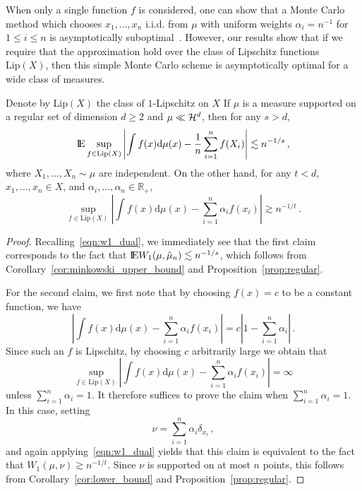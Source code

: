 \documentclass[sts]{imsart}
\newcommand{\RR}{\mathbb{R}}
\begin{document}
When only a single function $f$ is considered, one can show that a Monte Carlo method which chooses $x_1, \dots, x_n$ i.i.d. from $\mu$ with uniform weights $\alpha_i = n^{-1}$ for $1 \leq i \leq n$ is asymptotically suboptimal~\cite{Nov88}.
However, our results show that if we require that the approximation hold over the class of Lipschitz functions $\mathrm{Lip}(X)$, then this simple Monte Carlo scheme is asymptotically optimal for a wide class of measures.
\begin{proposition}
Denote by $\mathrm{Lip}(X)$ the class of $1$-Lipschitz on $X$
If $\mu$ is a measure supported on a regular set of dimension $d \geq 2$ and $\mu \ll \mathcal{H}^d$, then for any $s > d$,
\begin{equation*}
{\rm I}\kern-0.18em{\rm E}\sup_{f \in \mathrm{Lip}(X)}\left| \int f(x) \mathrm{d}\mu(x) - \frac 1 n \sum_{i=1}^n f(X_i)\right| \lesssim n^{-1/s}\,,
\end{equation*}
where $X_1, \dots, X_n \sim \mu$ are independent.
On the other hand, for any $t < d$, $x_1, \dots, x_n \in X$, and $\alpha_i, \dots, \alpha_n \in \RR_+$,
\begin{equation*}
\sup_{f \in \mathrm{Lip}(X)}\left| \int f(x) \mathrm{d}\mu(x) -  \sum_{i=1}^n \alpha_i f(x_i)\right| \gtrsim n^{-1/t}\,.
\end{equation*}
\end{proposition}
\begin{proof}
Recalling~\eqref{eqn:w1_dual}, we immediately see that the first claim corresponds to the fact that ${\rm I}\kern-0.18em{\rm E} W_1(\mu, \hat \mu_n) \lesssim n^{-1/s}$, which follows from Corollary~\ref{cor:minkowski_upper_bound} and Proposition~\ref{prop:regular}.

For the second claim, we first note that by choosing $f(x) = c$ to be a constant function, we have
\begin{equation*}
\left| \int f(x) \mathrm{d}\mu(x) -  \sum_{i=1}^n \alpha_i f(x_i)\right| = c \left|1 - \sum_{i=1}^n \alpha_i\right|\,.
\end{equation*}
Since such an $f$ is Lipschitz, by choosing $c$ arbitrarily large we obtain that
\begin{equation*}
\sup_{f \in \mathrm{Lip}(X)}\left| \int f(x) \mathrm{d}\mu(x) -  \sum_{i=1}^n \alpha_i f(x_i)\right| = \infty
\end{equation*}
unless $\sum_{i=1}^n \alpha_i = 1$.
It therefore suffices to prove the claim when $\sum_{i=1}^n \alpha_i = 1$.
In this case, setting
\begin{equation*}
\nu = \sum_{i=1}^n \alpha_i \delta_{x_i}\,,
\end{equation*}
and again applying~\eqref{eqn:w1_dual} yields that this claim is equivalent to the fact that $W_1(\mu, \nu) \gtrsim n^{-1/t}$.
Since $\nu$ is supported on at most $n$ points, this follows from Corollary~\ref{cor:lower_bound} and Proposition~\ref{prop:regular}.
\end{proof}
\end{document}
